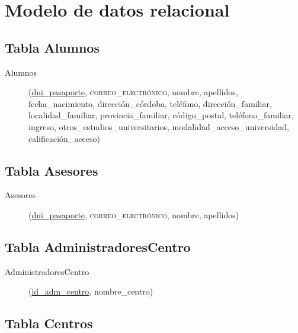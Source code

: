 \section{Modelo de datos relacional}

   \subsection{Tabla Alumnos}

      \begin{description}
         \item[Alumnos] \begin{flushleft}(\underline{dni\_pasaporte},
         \textsc{correo\_electrónico}, nombre, apellidos, fecha\_nacimiento,
         dirección\_córdoba, teléfono, dirección\_familiar, localidad\_familiar,
         provincia\_familiar, código\_postal, teléfono\_familiar, ingreso,
         otros\_estudios\_universitarios, modalidad\_acceso\_universidad,
         calificación\_acceso)\end{flushleft}
      \end{description}

   \subsection{Tabla Asesores}

      \begin{description}
         \item[Asesores] \begin{flushleft}(\underline{dni\_pasaporte},
         \textsc{correo\_electrónico}, nombre, apellidos)\end{flushleft}
      \end{description}

   \subsection{Tabla AdministradoresCentro}

      \begin{description}
         \item[AdministradoresCentro] \begin{flushleft}(\underline{id\_adm\_centro},
         nombre\_centro)\end{flushleft}
      \end{description}

   \subsection{Tabla Centros}

